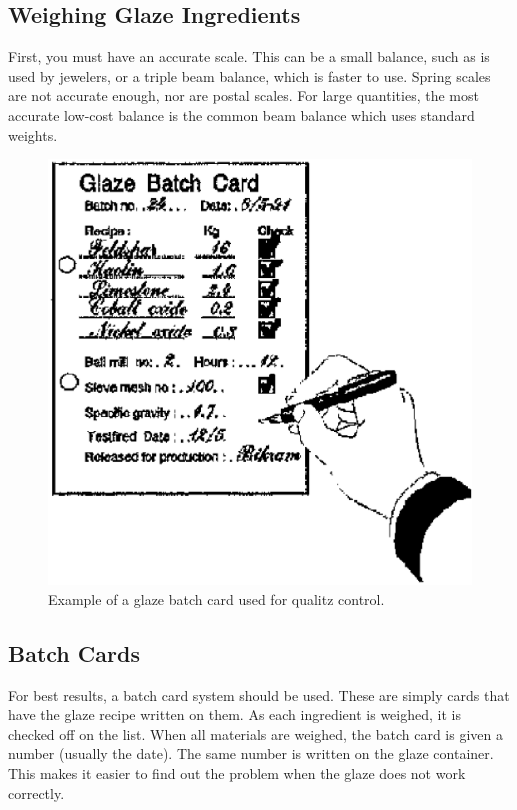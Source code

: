 \subsection{Weighing Glaze Ingredients}
First, you must have an accurate scale. This can be a small balance, such as is 
used by jewelers, or a triple beam balance, which is faster to use. Spring 
scales are not accurate enough, nor are postal scales. For large quantities, 
the most accurate low-cost balance is the common beam balance which uses 
standard weights.
\begin{figure}[htbp!]
  \centering
  \includegraphics[width=0.8\linewidth]{img/batchcard.eps}
  \caption{Example of a glaze batch card used for qualitz control.}
  \label{fig:batchcard}
\end{figure}
\subsection{Batch Cards}
\label{sec:batchcard}
For best results, a batch card system should be used. These are simply cards 
that have the glaze recipe written on them. As each ingredient is weighed, it 
is checked off on the list. When all materials are weighed, the batch card is 
given a number (usually the date). The same number is written on the glaze 
container. This makes it easier to find out the problem when the glaze does not 
work correctly.
